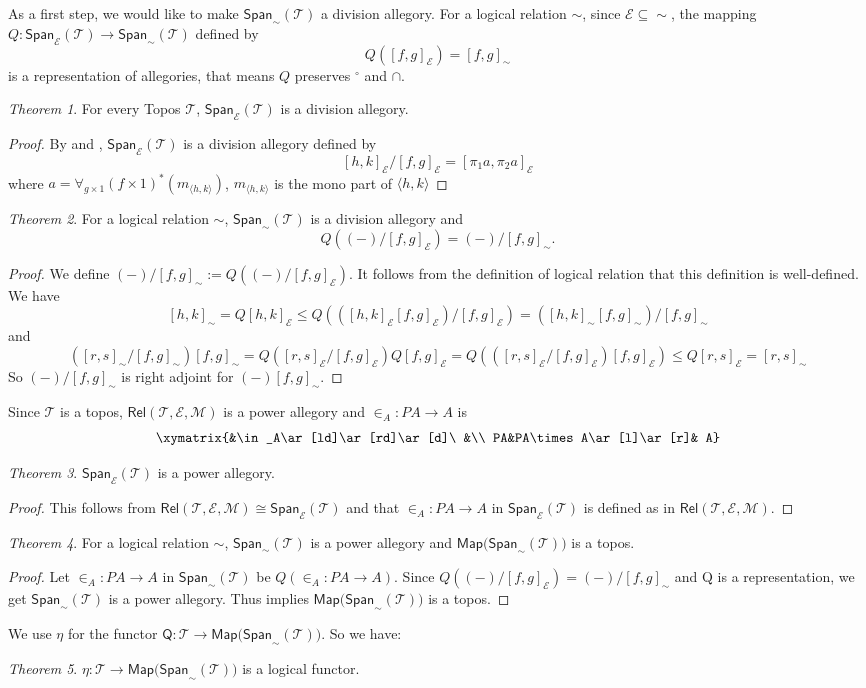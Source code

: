 \documentclass{tac}
\theoremstyle{definition}
\theoremstyle{remark}
\def\mc#1{\mathcal {#1}}
\def\T{\mc T}
\def\E{\mc E}
\def\M{\mc M}
\newtheorem{theorem}{Theorem}
\begin{document}
As a first step, we would like  to make $\mathsf{Span}_\sim(\T)$ a division allegory.
For a logical relation $\sim$, since $\E\subseteq \sim$, the mapping $Q:\mathsf{Span}_\E(\T)\longrightarrow \mathsf{Span}_\sim(\T)$ defined by $$Q([f,g]_\E)=[f,g]_\sim$$ is a representation of allegories, that means $Q$ preserves $^\circ$ and $\cap$.
\begin{theorem}
	For every Topos $\T$, $\mathsf{Span}_\E(\T)$ is a division allegory.
\end{theorem}
\begin{proof}
	 By \cite[Theorem 3.4.2]{john} and \cite[Theoem 4.2]{hsty}, $\mathsf{Span}_\E(\T)$ is a division allegory defined by
	$$[h,k]_\E/[f,g]_\E=[\pi_1a,\pi_2a]_\E$$
	where $a=\forall_{g\times 1}(f\times 1)^*(m_{\langle h,k\rangle})$, $m_{\langle h,k\rangle}$ is the mono part of $\langle h,k\rangle$
\end{proof}
\begin{theorem}
	For a logical relation $\sim$, $\mathsf{Span}_\sim(\T)$ is a division allegory and
$$Q((-)/[f,g]_\E)=(-)/[f,g]_\sim.$$
\end{theorem}
\begin{proof}
	We define $(-)/[f,g]_\sim:=Q((-)/[f,g]_\E)$. It follows from the definition of logical relation that this definition is well-defined.
	We have
	$$[h,k]_\sim=Q [h,k]_\E\le  Q(([h,k]_\E[f,g]_\E)/[f,g]_\E)=([h,k]_\sim[f,g]_\sim)/[f,g]_\sim$$
	and
	$$([r,s]_\sim/[f,g]_\sim)[f,g]_\sim=Q([r,s]_\E/[f,g]_\E)Q[f,g]_\E=Q(([r,s]_\E/[f,g]_\E)[f,g]_\E)\le Q[r,s]_\E=[r,s]_\sim$$
	So $(-)/[f,g]_\sim$ is right adjoint for $(-)[f,g]_\sim$.
\end{proof}
Since $\T$ is a topos, $\mathsf{Rel}(\T,\E,\M)$ is a power allegory and $\in_A:PA\rightarrow A$ is
$$\xymatrix{&\in_A\ar[ld]\ar[rd]\ar[d]\ &\\
	PA&PA\times A\ar[l]\ar[r]& A}$$
\begin{theorem}
	$\mathsf{Span}_\E(\T)$ is a power allegory.
\end{theorem}
\begin{proof}
	This follows from $\mathsf{Rel}(\T,\E,\M)\cong \mathsf{Span}_\E(\T)$ and that $\in_A:PA\rightarrow A$ in $\mathsf{Span}_\E(\T)$ is defined as in $\mathsf{Rel}(\T,\E,\M)$.
\end{proof}
\begin{theorem}
	For a logical relation $\sim$, $\mathsf{Span}_\sim(\T)$ is a power allegory and $\mathsf{Map(Span}_\sim(\T))$ is a topos.
\end{theorem}
\begin{proof}
	Let $\in_A:PA\rightarrow A$ in $\mathsf{Span}_\sim(\T)$ be $Q(\in_A:PA\rightarrow A)$. Since $Q((-)/[f,g]_\E)=(-)/[f,g]_\sim$ and Q is a representation, we get $\mathsf{Span}_\sim(\T)$ is a power allegory. Thus  \cite[Corollary 3.4.7]{john} implies $\mathsf{Map(Span}_\sim(\T))$ is a topos.
\end{proof}
We use $\eta$ for the functor $\mathsf{Q}:\T\longrightarrow\mathsf{Map(Span}_\sim(\T))$. So we have:
\begin{theorem}\label{logical functor}
	$\eta:\T\longrightarrow \mathsf{Map(Span}_\sim(\T))$ is a logical functor.
\end{theorem}
\end{document}
